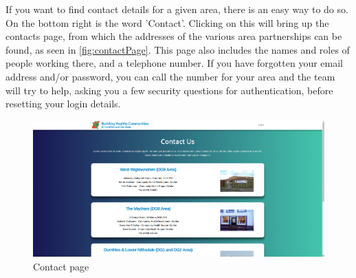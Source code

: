 \documentclass{bhcguides}
\begin{document}
If you want to find contact details for a given area, there is an easy way to do so. On the bottom right is the word 'Contact'. Clicking on this will bring up the contacts page, from which the addresses of the various area partnerships can be found, as seen in \autoref{fig:contactPage}. This page also includes the names and roles of people working there, and a telephone number. If you have forgotten your email address and/or password, you can call the number for your area and the team will try to help, asking you a few security questions for authentication, before resetting your login details.

\begin{figure}[h]
 \centerline{\includegraphics[width=\textwidth, height=\textheight, keepaspectratio]{contactpage.png}}
 \caption{Contact page}
 \label{fig:contactPage}
\end{figure}
\end{document}
